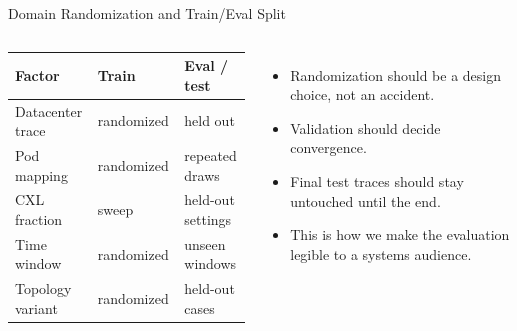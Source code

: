 \documentclass[10pt,aspectratio=169]{beamer}
\begin{document}
\begin{frame}{Domain Randomization and Train/Eval Split}
  \begin{columns}[T,onlytextwidth]
      \small
      \begin{tabular}{p{0.30\linewidth}p{0.28\linewidth}p{0.28\linewidth}}
        \toprule
        \textbf{Factor} & \textbf{Train} & \textbf{Eval / test} \\
        \midrule
        Datacenter trace & randomized & held out \\
        Pod mapping & randomized & repeated draws \\
        CXL fraction & sweep & held-out settings \\
        Time window & randomized & unseen windows \\
        Topology variant & randomized & held-out cases \\
        \bottomrule
      \end{tabular}
      \begin{itemize}
        \item Randomization should be a design choice, not an accident.
        \item Validation should decide convergence.
        \item Final test traces should stay untouched until the end.
        \item This is how we make the evaluation legible to a systems audience.
      \end{itemize}
  \end{columns}
\end{frame}
\end{document}
